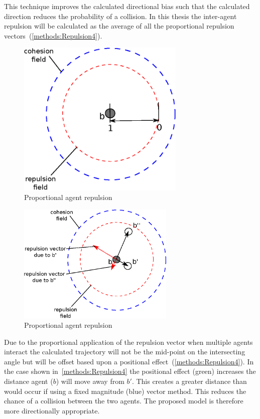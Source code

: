 This technique improves the calculated directional bias such that the calculated direction reduces the probability of a collision. In this thesis the inter-agent repulsion will be calculated as the average of all the proportional repulsion vectors~(\autoref{methods:Repulsion4}). 

\begin{figure}[H]
\begin{center}
\includegraphics[width=8cm]{CHAPTER-2/figures/Repulsion1}
\caption{Proportional agent repulsion \label{methods:Repulsion1}}
\end{center}
\end{figure}
 
\begin{figure}[H]
\begin{center}
\includegraphics[width=7.5cm]{CHAPTER-2/figures/Repulsion2}
\caption{Proportional agent repulsion \label{methods:Repulsion2}}
\end{center}
\end{figure}

Due to the proportional application of the repulsion vector when multiple agents interact the calculated trajectory will not be the mid-point on the intersecting angle but will be offset based upon a positional effect~(\autoref{methods:Repulsion4}). In the case shown in~\autoref{methods:Repulsion4} the positional effect (green) increases the distance agent ($b$) will move away from $b'$. This creates a greater distance than would occur if using a fixed magnitude (blue) vector method. This reduces the chance of a collision between the two agents. The proposed model is therefore more directionally appropriate. 

